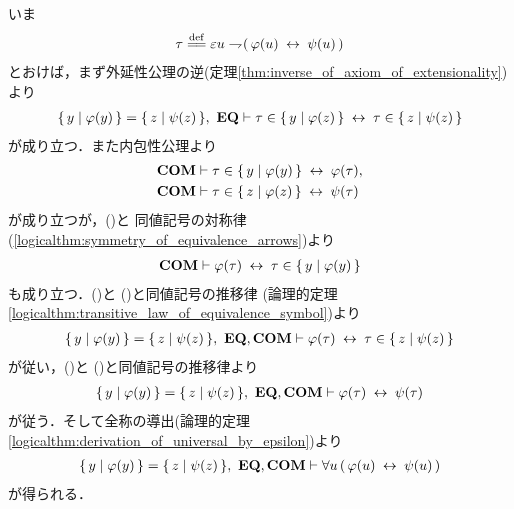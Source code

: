 	\begin{sketch}
		いま
		\begin{align}
			\tau \defeq \varepsilon u \negation (\, \varphi(u) \lrarrow \psi(u)\, )
		\end{align}
		とおけば，まず外延性公理の逆(定理\ref{thm:inverse_of_axiom_of_extensionality})より
		\begin{align}
			\{\, y \mid \varphi(y)\, \} = \{\, z \mid \psi(z)\, \},\ \mbox{{\bf EQ}} \vdash 
			\tau \in \{\, y \mid \varphi(z)\, \} \hspace{0.25em}\leftrightarrow\hspace{0.25em} \tau \in \{\, z \mid \psi(z)\, \}
			\label{fom:equivalent_formula_rewriting_5_1}
		\end{align}
		が成り立つ．また内包性公理より
		\begin{align}
			\mbox{\bf COM} &\vdash \tau \in \{\, y \mid \varphi(y)\, \} \hspace{0.25em}\leftrightarrow\hspace{0.25em} \varphi(\tau), 
			\label{fom:equivalent_formula_rewriting_5_2} \\
			\mbox{\bf COM} &\vdash \tau \in \{\, z \mid \varphi(z)\, \} \hspace{0.25em}\leftrightarrow\hspace{0.25em} \psi(\tau)
			\label{fom:equivalent_formula_rewriting_5_3}
		\end{align}
		が成り立つが，()と
		同値記号の対称律(\ref{logicalthm:symmetry_of_equivalence_arrows})より
		\begin{align}
			\mbox{\bf COM} \vdash \varphi(\tau) \hspace{0.25em}\leftrightarrow\hspace{0.25em} \tau \in \{\, y \mid \varphi(y)\, \}
			\label{fom:equivalent_formula_rewriting_5_4}
		\end{align}
		も成り立つ．()と
		()と同値記号の推移律
		(論理的定理\ref{logicalthm:transitive_law_of_equivalence_symbol})より
		\begin{align}
			\{\, y \mid \varphi(y)\, \} = \{\, z \mid \psi(z)\, \},\ \mbox{{\bf EQ}},\mbox{\bf COM} \vdash
			 \varphi(\tau) \hspace{0.25em}\leftrightarrow\hspace{0.25em} \tau \in \{\, z \mid \psi(z)\, \}
			\label{fom:equivalent_formula_rewriting_5_5}
		\end{align}
		が従い，()と
		()と同値記号の推移律より
		\begin{align}
			\{\, y \mid \varphi(y)\, \} = \{\, z \mid \psi(z)\, \},\ \mbox{{\bf EQ}},\mbox{\bf COM} \vdash
			\varphi(\tau) \hspace{0.25em}\leftrightarrow\hspace{0.25em} \psi(\tau)
		\end{align}
		が従う．そして全称の導出(論理的定理\ref{logicalthm:derivation_of_universal_by_epsilon})より
		\begin{align}
			\{\, y \mid \varphi(y)\, \} = \{\, z \mid \psi(z)\, \},\ \mbox{{\bf EQ}},\mbox{\bf COM} \vdash
			\forall u\, (\, \varphi(u) \hspace{0.25em}\leftrightarrow\hspace{0.25em} \psi(u)\, )
		\end{align}
		が得られる．
		\QED
	\end{sketch}
	
